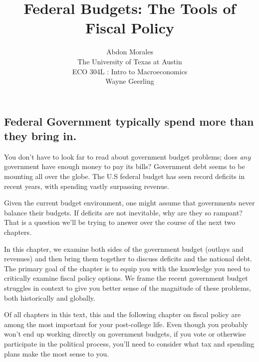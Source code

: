 \documentclass[11pt]{article} %
\title{Federal Budgets: The Tools of Fiscal Policy}
\author{Abdon Morales \\ The University of Texas at Austin \\ ECO 304L : Intro to Macroeconomics \\ Wayne Geerling}
\date{\date \\ Chapter 15 : Week 9}
\begin{document}
\maketitle
\subsection*{Federal Government typically spend more than they bring in.}
You don't have to look far to read about government budget problems; does \textit{any} government have enough money to pay its bills? Government debt seems to be mounting all over the globe. The U.S federal budget has seen record deficits in recent years, with spending vastly surpassing revenue.

Given the current budget environment, one might assume that governments never balance their budgets. If deficits are not inevitable, why are they so rampant? That is a question we'll be trying to answer over the course of the next two chapters.

In this chapter, we examine both sides of the government budget (outlays and revenues) and then bring them together to discuss deficits and the national debt. The primary goal of the chapter is to equip you with the knowledge you need to critically examine fiscal policy options. We frame the recent government budget struggles in context to give you better sense of the magnitude of these problems, both historically and globally.

Of all chapters in this text, this and the following chapter on fiscal policy are among the most important for your post-college life. Even though you probably won't end up working directly on government budgets, if you vote or otherwise participate in the political process, you'll need to consider what tax and spending plans make the most sense to you.
\end{document}
